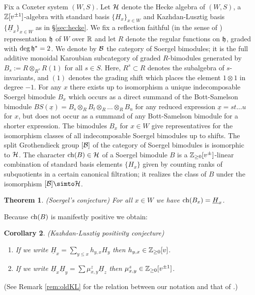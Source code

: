 \documentclass[11pt]{amsart}
\numberwithin{equation}{section}
\def\un{\underline}
\newtheorem{thm}{Theorem}[section]
\newtheorem{cor}[thm]{Corollary}
\theoremstyle{definition}
\theoremstyle{remark}
\begin{document}
Fix a Coxeter system $(W,S)$. Let ${\mathcal{H}}$ denote the Hecke algebra of
$(W,S)$, a ${\mathbb{Z}}[v^{\pm 1}]$-algebra with standard basis $\{H_x\}_{x \in W}$ and Kazhdan-Lusztig
basis $\{\un{H}_x\}_{x \in W}$ as in \S\ref{sec:hecke}.
We fix a reflection faithful (in the sense of \cite[Definition 1.5]{S3}) representation ${\mathfrak h}$ of $W$ over ${\mathbb{R}}$ and let
$R$ denote the regular functions on ${\mathfrak h}$, graded with $\deg {\mathfrak h}^* =2$. We denote by ${\mathcal{B}}$ the category of Soergel bimodules; it is the full
additive monoidal Karoubian subcategory of graded $R$-bimodules generated by $B_s := R \otimes_{R^s} R(1)$ for all $s \in S$. Here, $R^s \subset R$
denotes the subalgebra of $s$-invariants, and $(1)$ denotes the grading shift which places the element $1 \otimes 1$ in degree $-1$. For any $x$ there exists up to isomorphism a unique indecomposable Soergel bimodule $B_x$ which occurs as
a direct summand of the Bott-Samelson bimodule $BS(\un{x}) = B_s\otimes_R B_t \otimes_R \dots \otimes_R B_u$ for any reduced expression $\un{x} =
st\dots u$ for $x$, but does not occur as a summand of any Bott-Samelson bimodule for a shorter expression. The bimodules $B_x$ for $x \in W$ give
representatives for the isomorphism classes of all indecomposable Soergel bimodules up to shifts. The split Grothendieck group $[{\mathcal{B}}]$ of the
category of Soergel bimodules is isomorphic to ${\mathcal{H}}$. The character $\operatorname{ch}(B) \in {\mathcal{H}}$ of a Soergel bimodule $B$ is a ${\mathbb{Z}}_{\ge 0}[v^{\pm}]$-linear
combination of standard basis elements $\{H_x\}$ given by counting ranks of subquotients in a certain canonical filtration; it realizes the class of
$B$ under the isomorphism $[\BC] \simto \HC$.

\begin{thm} (Soergel's conjecture) \label{thm:SC} For all $x \in W$ we
  have $\ch(B_x) = \un{H}_x$. \end{thm}

Because $\operatorname{ch}(B)$ is manifestly positive we obtain:

\begin{cor} (Kazhdan-Lusztig positivity conjecture) \begin{enumerate} \item If we write $\un{H}_x = \sum_{y \le x} h_{y,x} H_y$ then $h_{y,x} \in {\mathbb{Z}}_{\ge 0}[v]$. \item If we write
$\un{H}_x\un{H}_y = \sum \mu^z_{x,y} \un{H}_z$ then $\mu^z_{x,y} \in {\mathbb{Z}}_{\ge 0}[v^{\pm 1}]$. \end{enumerate} \end{cor}
(See Remark \ref{rem:oldKL} for the relation between our notation and
that of \cite{KL1}.)
\end{document}
